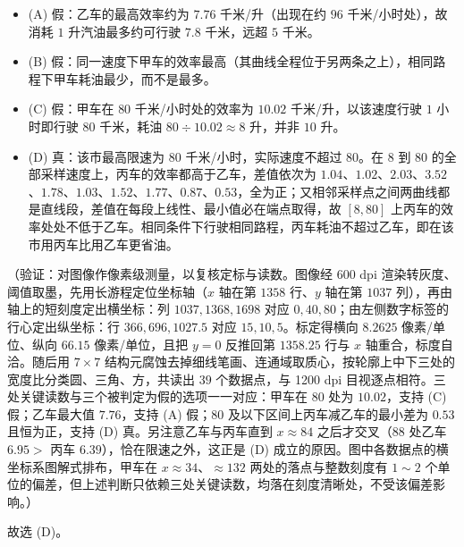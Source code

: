 \begin{answer}
\begin{itemize}
\item (A) 假：乙车的最高效率约为 \(7.76\) 千米/升（出现在约 \(96\) 千米/小时处），故消耗 \(1\) 升汽油最多约可行驶 \(7.8\) 千米，远超 \(5\) 千米。
\item (B) 假：同一速度下甲车的效率最高（其曲线全程位于另两条之上），相同路程下甲车耗油最少，而不是最多。
\item (C) 假：甲车在 \(80\) 千米/小时处的效率为 \(10.02\) 千米/升，以该速度行驶 \(1\) 小时即行驶 \(80\) 千米，耗油 \(80\div10.02\approx8\) 升，并非 \(10\) 升。
\item (D) 真：该市最高限速为 \(80\) 千米/小时，实际速度不超过 \(80\)。在 \(8\) 到 \(80\) 的全部采样速度上，丙车的效率都高于乙车，差值依次为 \(1.04\)、\(1.02\)、\(2.03\)、\(3.52\)、\(1.78\)、\(1.03\)、\(1.52\)、\(1.77\)、\(0.87\)、\(0.53\)，全为正；又相邻采样点之间两曲线都是直线段，差值在每段上线性、最小值必在端点取得，故 \([8,80]\) 上丙车的效率处处不低于乙车。相同条件下行驶相同路程，丙车耗油不超过乙车，即在该市用丙车比用乙车更省油。
\end{itemize}
（验证：对图像作像素级测量，以复核定标与读数。图像经 600 dpi 渲染转灰度、阈值取墨，先用长游程定位坐标轴（\(x\) 轴在第 \(1358\) 行、\(y\) 轴在第 \(1037\) 列），再由轴上的短刻度定出横坐标：列 \(1037,1368,1698\) 对应 \(0,40,80\)；由左侧数字标签的行心定出纵坐标：行 \(366,696,1027.5\) 对应 \(15,10,5\)。标定得横向 \(8.2625\) 像素/单位、纵向 \(66.15\) 像素/单位，且把 \(y=0\) 反推回第 \(1358.25\) 行与 \(x\) 轴重合，标度自洽。随后用 \(7\times7\) 结构元腐蚀去掉细线笔画、连通域取质心，按轮廓上中下三处的宽度比分类圆、三角、方，共读出 \(39\) 个数据点，与 1200 dpi 目视逐点相符。三处关键读数与三个被判定为假的选项一一对应：甲车在 \(80\) 处为 \(10.02\)，支持 (C) 假；乙车最大值 \(7.76\)，支持 (A) 假；\(80\) 及以下区间上丙车减乙车的最小差为 \(0.53\) 且恒为正，支持 (D) 真。另注意乙车与丙车直到 \(x\approx84\) 之后才交叉（\(88\) 处乙车 \(6.95>\) 丙车 \(6.39\)），恰在限速之外，这正是 (D) 成立的原因。图中各数据点的横坐标系图解式排布，甲车在 \(x\approx34\)、\(\approx132\) 两处的落点与整数刻度有 \(1\sim2\) 个单位的偏差，但上述判断只依赖三处关键读数，均落在刻度清晰处，不受该偏差影响。）

故选 (D)。


\end{answer}
